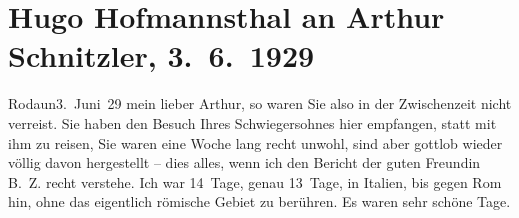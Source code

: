 

         
         \newcommand{\erwaehntePersonen}{Personen: Arnoldo Cappellini, Berta Zuckerkandl}
         \newcommand{\erwaehnteInstitutionen}{}
         \newcommand{\erwaehnteOrte}{Orte: Italien, Rodaun, Rom, Wien}
         \newcommand{\erwaehnteWerke}{Werke: Der Weg ins Freie. Roman, Der einsame Weg. Schauspiel in fünf Akten, Dämmerseelen. Novellen, Fräulein Else, Lieutenant Gustl. Novelle}
               \section[Hugo Hofmannsthal an Arthur Schnitzler, 3. 6. 1929]{ Hugo Hofmannsthal an Arthur Schnitzler, 3. 6. 1929}\nopagebreak{}\rehead{ }\begin{ledgroupsized}[t]{13cm}\normalsize\beginnumbering \toendnotes[C]{\smallbreak\pagebreak[2]} 
\toendnotes[C]{\smallbreak}\pstart
           {\pb}Rodaun3. Juni 29\pend
           \pstart{}mein lieber Arthur, \pend\pstart
           so waren Sie also in der Zwischenzeit nicht verreist. Sie haben den Besuch Ihres Schwiegersohnes hier empfangen,
               statt mit ihm zu reisen,  Sie waren eine Woche
               lang recht unwohl, sind aber gottlob wieder völlig davon hergestellt – dies alles,
               wenn ich den Bericht der guten Freundin B. Z.
               recht verstehe.\pend
           \pstart
           Ich war 14 Tage, genau 13 Tage, in Italien, bis
               gegen Rom hin, ohne das eigentlich römische Gebiet zu berühren. Es waren sehr schöne Tage.\pend

\end{ledgroupsized}

